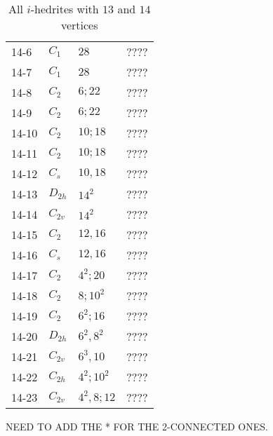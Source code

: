 \documentclass[12pt]{article}
\begin{document}
\begin{table}
\begin{center}
{\begin{minipage}[t]{6cm}
\begin{tabular}{||l|l|l|l||}
14-6 	&$C_1$	&$28$		&????\\
14-7 	&$C_1$	&$28$		&????\\
14-8	&$C_{2}$	&$6; 22$		&????\\
14-9 	&$C_2$	&$6; 22$		&????\\
14-10	&$C_2$	&$10; 18$		&????\\
14-11	&$C_2$	&$10; 18$		&????\\
14-12	&$C_s$	&$10, 18$		&????\\
14-13	&$D_{2h}$	&$14^2$		&????\\
14-14	&$C_{2v}$	&$14^2$		&????\\
14-15	&$C_2$	&$12, 16$		&????\\
14-16	&$C_{s}$	&$12, 16$		&????\\
14-17	&$C_2$	&$4^2; 20$	&????\\
14-18	&$C_2$	&$8; 10^2$	&????\\
14-19	&$C_2$	&$6^2; 16$	&????\\
14-20	&$D_{2h}$	&$6^2, 8^2$	&????\\
14-21	&$C_{2v}$	&$6^3, 10$	&????\\
14-22	&$C_{2h}$	&$4^2; 10^2$	&????\\
14-23	&$C_{2v}$	&$4^2, 8; 12$	&????\\\hline
\end{tabular}
\end{minipage}
}
NEED TO ADD THE * FOR THE 2-CONNECTED ONES.
\end{center}
\caption{All $i$-hedrites with $13$ and $14$ vertices}
\label{tab:i-hedrite13_14}
\end{table}
\end{document}
